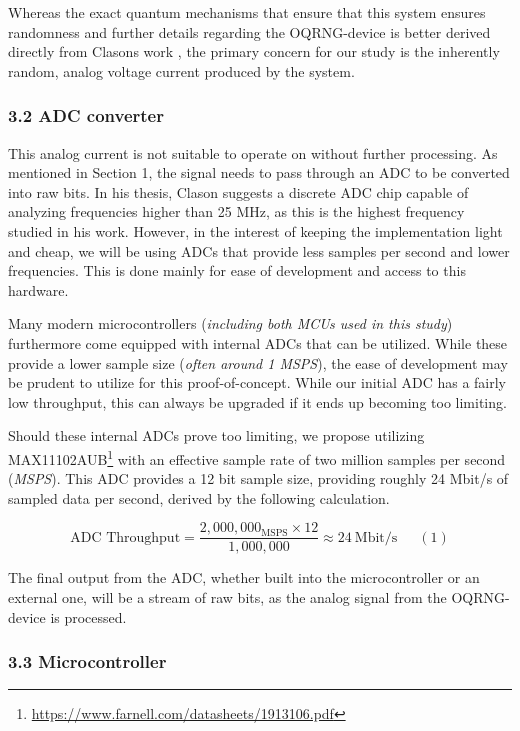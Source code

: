 Whereas the exact quantum mechanisms that ensure that this system ensures randomness and further details regarding the OQRNG-device is better derived directly from Clasons work \cite{Clason2023}, the primary concern for our study is the inherently random, analog voltage current produced by the system.

\subsubsection{3.2 ADC converter}\label{adc-converter}

This analog current is not suitable to operate on without further processing. As mentioned in Section 1, the signal needs to pass through an ADC to be converted into raw bits. In his thesis, Clason \cite{Clason2023} suggests a discrete ADC chip capable of analyzing frequencies higher than 25 MHz, as this is the highest frequency studied in his work. However, in the interest of keeping the implementation light and cheap, we will be using ADCs that provide less samples per second and lower frequencies. This is done mainly for ease of development and access to this hardware.

Many modern microcontrollers (\emph{including both MCUs used in this study}) furthermore come equipped with internal ADCs that can be utilized. While these provide a lower sample size (\emph{often around 1 MSPS}), the ease of development may be prudent to utilize for this proof-of-concept. While our initial ADC has a fairly low throughput, this can always be upgraded if it ends up becoming too limiting.

Should these internal ADCs prove too limiting, we propose utilizing MAX11102AUB\footnote{\url{https://www.farnell.com/datasheets/1913106.pdf}} with an effective sample rate of two million samples per second (\emph{MSPS}). This ADC provides a 12 bit sample size, providing roughly 24 Mbit/s of sampled data per second, derived by the following calculation.

\[
\text{ADC Throughput}
= \frac{2,000,000_{\mathrm{MSPS}}\times12}{1,000,000}
\approx24\ \mathrm{Mbit/s}\phantom{123}(1)
\]

The final output from the ADC, whether built into the microcontroller or an external one, will be a stream of raw bits, as the analog signal from the OQRNG-device is processed.

\subsubsection{3.3 Microcontroller}\label{microcontroller}


